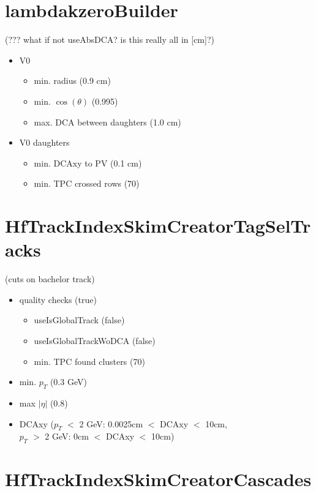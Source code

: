 \documentclass[a4paper,10pt]{article}
\title{}
\author{}
\date{}
\begin{document}
\section{lambdakzeroBuilder}
(??? what if not useAbsDCA? is this really all in [cm]?)
\begin{itemize}
 \item V0
 \begin{itemize}
 \item min. radius (0.9 cm)
 \item min. $\cos(\theta)$ (0.995)
 \item max. DCA between daughters (1.0 cm)
 \end{itemize}
 \item V0 daughters
 \begin{itemize}
 \item min. DCAxy to PV (0.1 cm)
 \item min. TPC crossed rows (70)
 \end{itemize}

\end{itemize}


\section{HfTrackIndexSkimCreatorTagSelTracks}
(cuts on bachelor track)
\begin{itemize}
\item quality checks (true)
\begin{itemize}
\item useIsGlobalTrack (false)
\item useIsGlobalTrackWoDCA (false)
\item min. TPC found clusters (70)
\end{itemize}
 \item min. $p_T$ (0.3 GeV)
 \item max $|\eta|$ (0.8)
 \item DCAxy ($p_T$ $<$ 2 GeV: 0.0025cm $<$ DCAxy $<$ 10cm,\\ \hspace*{1.4cm}$p_T$ $>$ 2 GeV: 0cm $<$ DCAxy $<$ 10cm)
\end{itemize}

\section{HfTrackIndexSkimCreatorCascades}
\end{document}
